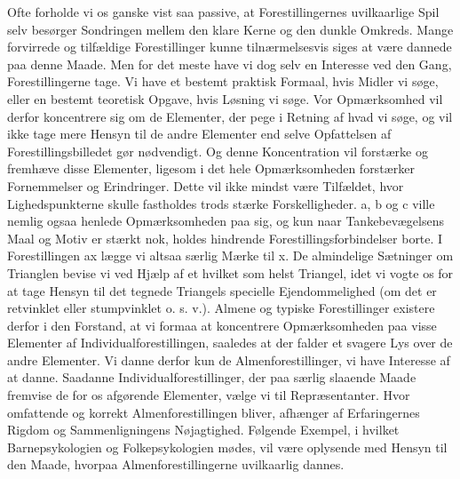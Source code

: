 \documentclass[12pt,a4paper,openany]{book}
\newcommand{\opage}[1]{\marginnote{\footnotesize\textit{[#1]}}}
\begin{document}
Ofte forholde vi os ganske vist saa passive, at Forestillingernes
uvilkaarlige Spil selv besørger Sondringen mellem den klare Kerne og den
dunkle Omkreds. Mange forvirrede og tilfældige Forestillinger kunne
tilnærmelsesvis siges at være dannede paa denne Maade. Men for det meste
have vi dog selv en Interesse ved den Gang, Forestillingerne tage. Vi
have et bestemt praktisk Formaal, hvis Midler vi søge, eller en bestemt
teoretisk Opgave, hvis Løsning vi søge. Vor Opmærksomhed vil derfor
koncentrere sig om de Elementer, der pege i Retning af hvad vi søge, og
vil ikke tage mere Hensyn til de andre Elementer end selve Opfattelsen
af Forestillingsbilledet gør nødvendigt. Og denne Koncentration vil
forstærke og fremhæve disse Elementer, ligesom i det hele Opmærksomheden
forstærker Fornemmelser og Erindringer. Dette vil ikke mindst være
Tilfældet, hvor Lighedspunkterne skulle fastholdes trods stærke
Forskelligheder. a, b og c ville nemlig ogsaa henlede Opmærksomheden paa
sig, og kun naar Tankebevægelsens Maal og Motiv er stærkt nok, holdes
hindrende Forestillingsforbindelser borte. I Forestillingen ax lægge vi
altsaa særlig Mærke til x. De almindelige Sætninger om Trianglen bevise
vi ved Hjælp af et hvilket som helst Triangel, idet vi vogte os for at
tage Hensyn til det tegnede Triangels specielle Ejendommelighed (om det
er retvinklet eller stumpvinklet o. s. v.). Almene og typiske
Forestillinger existere derfor i den Forstand, at vi formaa at
koncentrere Opmærksomheden paa visse Elementer af
Individualforestillingen, saaledes at der falder et
\opage{204}svagere Lys over de andre Elementer. Vi danne derfor kun de
Almenforestillinger, vi have Interesse af at danne. Saadanne
Individualforestillinger, der paa særlig slaaende Maade fremvise de for
os afgørende Elementer, vælge vi til Repræsentanter. Hvor omfattende og
korrekt Almenforestillingen bliver, afhænger af Erfaringernes Rigdom og
Sammenligningens Nøjagtighed. Følgende Exempel, i hvilket
Barnepsykologien og Folkepsykologien mødes, vil være oplysende med
Hensyn til den Maade, hvorpaa Almenforestillingerne uvilkaarlig dannes.
\end{document}
